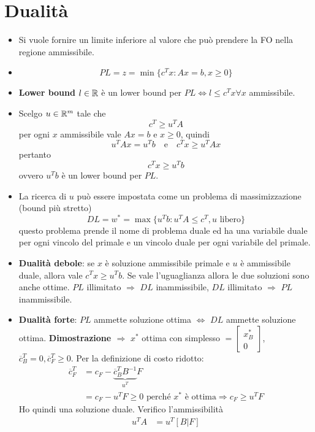 \section{Dualità}

\begin{itemize}
	\item Si vuole fornire un limite inferiore al valore che può prendere la FO nella regione ammissibile.
	\item $$
	PL = z = \min\{  c^Tx : Ax = b, x\geq 0 \}
	$$
	\item \textbf{Lower bound} $l \in \mathbb{R}$ è un lower bound per $PL \Leftrightarrow l \leq c^Tx \forall x$ ammissibile.
	\item Scelgo $u \in \mathbb{R}^m$ tale che
	$$
	c^T \geq u^T A
	$$
	per ogni $x$ ammissibile vale $Ax=b$ e $x \geq 0$, quindi
	$$
	u^TA x = u^Tb \quad\text{e}\quad c^Tx \geq u^TAx
	$$
	pertanto
	$$
	c^Tx \geq u^Tb
	$$
	ovvero $u^Tb$ è un lower bound per $PL$.
	\item La ricerca di $u$ può essere impostata come un problema di massimizzazione (bound più stretto)
	$$
	DL = w^* = \max \{ u^Tb : u^TA \leq c^T, u \text{ libero} \}
	$$
	questo problema prende il nome di problema duale ed ha una variabile duale per ogni vincolo del primale e un vincolo duale per ogni variabile del primale.
	\item \textbf{Dualità debole}: se $x$ è soluzione ammissibile primale e $u$ è ammissibile duale, allora vale $c^Tx \geq u^{T}b$. Se vale l'uguaglianza allora le due soluzioni sono anche ottime. $PL$ illimitato $\Rightarrow$ $DL$ inammissibile, $DL$ illimitato $\Rightarrow$ $PL$ inammissibile.
	\item \textbf{Dualità forte}: $PL$ ammette soluzione ottima $\Leftrightarrow$ $DL$ ammette soluzione ottima. \textbf{Dimostrazione $\Rightarrow$} $x^*$ ottima con simplesso $= \begin{bmatrix}
	x^*_B \\
	0
	\end{bmatrix}$, $\overline{c}_{B}^T = 0,\overline{c}_{F}^T \geq 0$. Per la definizione di costo ridotto:
	\begin{align*}
	\overline{c}_{F}^T &= c_F - \underbrace{\overline{c}_{B}^TB^{-1}}_{u^T}F \\
					   &= c_F - u^T F \geq 0 \text{ perché $x^*$ è ottima} \Rightarrow c_F \geq u^TF
	\end{align*}
	Ho quindi una soluzione duale. Verifico l'ammissibilità
	\begin{align*}
		u^T A &= u^T[B|F] \\

\end{align*}
\end{itemize}
